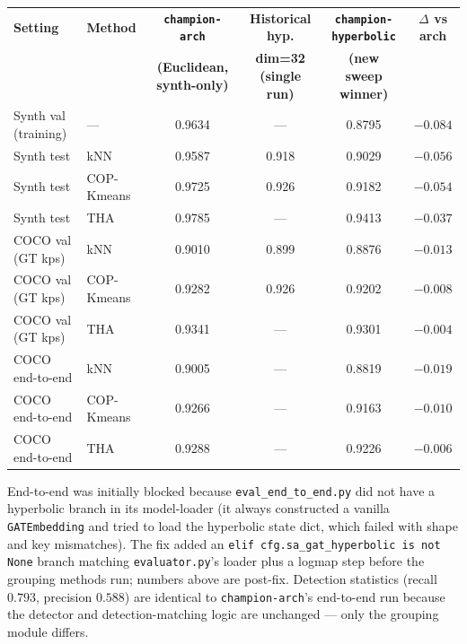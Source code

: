 \begin{tabular}{llcccc}
\hline
\textbf{Setting} & \textbf{Method} & \textbf{\texttt{champion-arch}} & \textbf{Historical hyp.} & \textbf{\texttt{champion-hyperbolic}} & \textbf{$\Delta$ vs arch} \\
                 &                  & \textbf{(Euclidean, synth-only)} & \textbf{dim=32 (single run)} & \textbf{(new sweep winner)} & \\
\hline
Synth val (training)        & ---          & 0.9634          & ---     & 0.8795 & $-0.084$ \\
\hline
Synth test                  & kNN          & 0.9587          & 0.918   & 0.9029 & $-0.056$ \\
Synth test                  & COP-Kmeans   & 0.9725          & 0.926   & 0.9182 & $-0.054$ \\
Synth test                  & THA          & 0.9785          & ---     & 0.9413 & $-0.037$ \\
\hline
COCO val (GT kps)           & kNN          & 0.9010          & 0.899   & 0.8876 & $-0.013$ \\
COCO val (GT kps)           & COP-Kmeans   & 0.9282          & 0.926   & 0.9202 & $-0.008$ \\
COCO val (GT kps)           & THA          & 0.9341          & ---     & 0.9301 & $-0.004$ \\
\hline
COCO end-to-end             & kNN          & 0.9005          & ---     & 0.8819 & $-0.019$ \\
COCO end-to-end             & COP-Kmeans   & 0.9266          & ---     & 0.9163 & $-0.010$ \\
COCO end-to-end             & THA          & 0.9288          & ---     & 0.9226 & $-0.006$ \\
\hline
\end{tabular}

\vspace{0.5em}

End-to-end was initially blocked because \texttt{eval\_end\_to\_end.py} did not have a hyperbolic branch in its model-loader (it always constructed a vanilla \texttt{GATEmbedding} and tried to load the hyperbolic state dict, which failed with shape and key mismatches).
The fix added an \texttt{elif cfg.sa\_gat\_hyperbolic is not None} branch matching \texttt{evaluator.py}'s loader plus a logmap step before the grouping methods run; numbers above are post-fix.
Detection statistics (recall $0.793$, precision $0.588$) are identical to \texttt{champion-arch}'s end-to-end run because the detector and detection-matching logic are unchanged --- only the grouping module differs.

